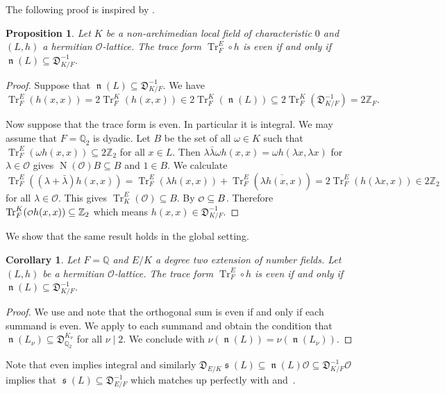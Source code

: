 \documentclass[a4paper]{amsart}
\theoremstyle{definition}
\theoremstyle{plain}
\newtheorem{proposition}[definition]{Proposition}
\newtheorem{corollary}[definition]{Corollary}
\DeclareMathOperator{\Tr}{Tr}
\DeclareMathOperator{\Nr}{N}
\DeclareMathOperator{\scale}{\mathfrak{s}}
\DeclareMathOperator{\norm}{\mathfrak{n}}
\newcommand{\QQ}{\mathbb{Q}}
\newcommand{\ZZ}{\mathbb{Z}}
\renewcommand{\O}{\mathcal{O}}
\newcommand{\FD}{\mathfrak{D}}
\renewcommand\o{
  \mathchoice
    {{\scriptstyle\mathcal{O}}}%
    {{\scriptstyle\mathcal{O}}}%
    {{\scriptscriptstyle\mathcal{O}}}%
    {\scalebox{.7}{$\scriptscriptstyle\mathcal{O}$}}%
  }
\begin{document}
The following proof is inspired by \cite[3.1.9]{michael2015}.
\begin{proposition}\label{eventracelocal}
Let $K$ be a non-archimedian local field of characteristic $0$ and $(L,h)$ a hermitian $\O$-lattice.
The trace form $\Tr^E_F \circ h$ is even if and only if
  $\norm(L) \subseteq \FD_{K/F}^{-1}$.
\end{proposition}

\begin{proof}
  Suppose that $\norm(L)  \subseteq {\FD_{K/F}^{-1}}$.
We have
  \[\Tr^E_F(h(x,x))= 2 \Tr^K_F(h(x,x)) \in 2 \Tr^K_F(\norm(L)) \subseteq 2 \Tr^K_F({\FD_{K/F}^{-1}})=2 \ZZ_F.\]

Now suppose that the trace form is even. In particular it is integral.
We may assume that $F = \QQ_2$ is dyadic.
Let $B$ be the set of all $\omega \in K$ such that
$\Tr^{E}_F(\omega h(x,x))\subseteq 2\ZZ_2$ for all $x \in L$. Then $\lambda \bar \lambda \omega h(x,x)=\omega h(\lambda x,\lambda x)$ for $\lambda \in \O$ gives $\Nr(\O) B \subseteq B$ and $1 \in B$. We calculate
  \[\Tr^E_F((\lambda +\bar \lambda) h(x,x)) = \Tr^E_F (\lambda h(x,x))+ \Tr^E_F (\overline{ \lambda h(x,x)}) = 2 \Tr^E_F(h(\lambda x,x)) \in 2\ZZ_2 \]
  for all $\lambda \in \O$.
This gives $\Tr^E_K(\O) \subseteq B$.
By  $\o \subseteq B$.
  Therefore $\Tr^K_F(\o h(x,x))\subseteq \ZZ_2$ which means $h(x,x)\in {\FD_{K/F}^{-1}}$.
\end{proof}

We show that the same result holds in the global setting.


\begin{corollary}\label{trace}
Let $F=\QQ$ and $E/K$ a degree two extension of number fields. Let $(L,h)$ be a hermitian $\O$-lattice.
The trace form $\Tr^E_F \circ h$ is even if and only if
$\norm(L) \subseteq {\FD_{K/F}^{-1}}$.
\end{corollary}

\begin{proof}
We use  and 
note that the orthogonal sum is even if and only if each summand is even.
We apply  to each summand and obtain the condition that
$\norm(L_\nu) \subseteq \FD^{K_\nu}_{\QQ_2}$ for all $\nu \mid 2$.
We conclude with $\nu(\norm(L)) = \nu(\norm(L_\nu))$.
\end{proof}

Note that even implies integral and similarly ${\FD_{E/K}} \scale(L) \subseteq \norm(L)\O \subseteq {\FD_{K/F}^{-1}}\O$ implies that $\scale(L) \subseteq {\FD_{E/F}^{-1}}$ which matches up perfectly with  and~.
\end{document}
